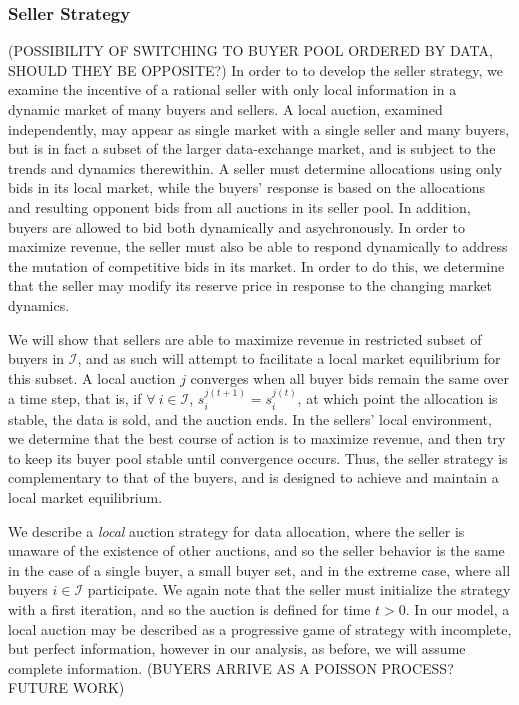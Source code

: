 \documentclass[12pt]{article}
\theoremstyle{definition}
\newcommand{\mcI}{\mathcal{I}}
\begin{document}
\begin{multicols}{2}
\subsubsection{Seller Strategy}
(POSSIBILITY OF SWITCHING TO BUYER POOL ORDERED BY DATA, SHOULD THEY BE
OPPOSITE?)
In order to to develop the seller strategy, we examine the incentive of a
rational seller with only local information in a dynamic market of many
buyers and sellers. A local auction, examined independently, may appear as
single market with a single seller and many buyers, but is in fact a subset of the
larger data-exchange market, and is subject to the trends and dynamics
therewithin. A seller must determine allocations using only bids in its local market, while the buyers' response is based on the
allocations and resulting opponent bids from all auctions in its seller pool.
In addition, buyers are allowed to bid both dynamically and asychronously. 
In order to
maximize revenue, the seller must also be able to respond dynamically to
address the mutation of competitive bids in its market. In order to do this, we
determine that the seller may modify its reserve price in response to the
changing market dynamics.

We will show that sellers are able to maximize revenue in restricted subset of
buyers in $\mcI$, and as such will attempt to facilitate a local market
equilibrium for this subset. A local auction $j$ converges when all buyer bids
remain the same over a time step, that is, if $\forall \ i \in\mcI$,
$s_i^{j(t+1)} = s_i^{j(t)}$, at which point the allocation is stable, the data
is sold, and the auction ends. In the sellers' local environment, we determine
that the best course of action is to maximize revenue, and then try to keep its
buyer pool stable until convergence occurs. Thus, the seller strategy is
complementary to that of the buyers, and is designed to achieve and maintain a
local market equilibrium. 

We describe a \emph{local} auction strategy for data allocation, where the seller is unaware of the existence of other auctions, and so
the seller behavior is the same in the case of a single buyer, a small buyer set, and in the
extreme case, where all buyers $i\in\mcI$ participate. We again note that the
seller must initialize the strategy with a first iteration, and so the auction
is defined for time $t>0$.
In our model, a local auction may be described as a progressive game of strategy with
incomplete, but perfect information, however in our analysis, as before, we will assume
complete information. 
(BUYERS ARRIVE AS A POISSON PROCESS? FUTURE WORK)


\end{multicols}
\end{document}
